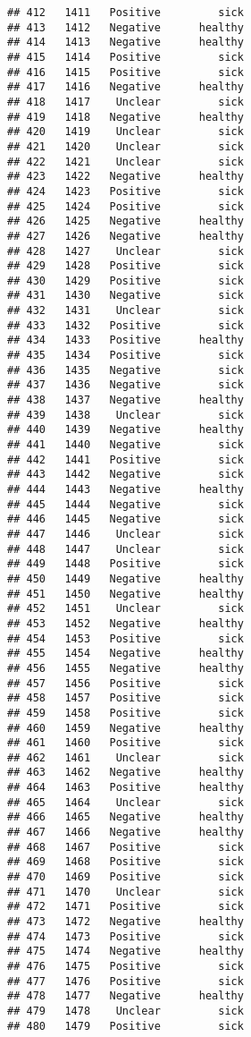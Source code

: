 \documentclass[
]{article}
\begin{document}
\begin{verbatim}
## 412   1411   Positive         sick
## 413   1412   Negative      healthy
## 414   1413   Negative      healthy
## 415   1414   Positive         sick
## 416   1415   Positive         sick
## 417   1416   Negative      healthy
## 418   1417    Unclear         sick
## 419   1418   Negative      healthy
## 420   1419    Unclear         sick
## 421   1420    Unclear         sick
## 422   1421    Unclear         sick
## 423   1422   Negative      healthy
## 424   1423   Positive         sick
## 425   1424   Positive         sick
## 426   1425   Negative      healthy
## 427   1426   Negative      healthy
## 428   1427    Unclear         sick
## 429   1428   Positive         sick
## 430   1429   Positive         sick
## 431   1430   Negative         sick
## 432   1431    Unclear         sick
## 433   1432   Positive         sick
## 434   1433   Positive      healthy
## 435   1434   Positive         sick
## 436   1435   Negative         sick
## 437   1436   Negative         sick
## 438   1437   Negative      healthy
## 439   1438    Unclear         sick
## 440   1439   Negative      healthy
## 441   1440   Negative         sick
## 442   1441   Positive         sick
## 443   1442   Negative         sick
## 444   1443   Negative      healthy
## 445   1444   Negative         sick
## 446   1445   Negative         sick
## 447   1446    Unclear         sick
## 448   1447    Unclear         sick
## 449   1448   Positive         sick
## 450   1449   Negative      healthy
## 451   1450   Negative      healthy
## 452   1451    Unclear         sick
## 453   1452   Negative      healthy
## 454   1453   Positive         sick
## 455   1454   Negative      healthy
## 456   1455   Negative      healthy
## 457   1456   Positive         sick
## 458   1457   Positive         sick
## 459   1458   Positive         sick
## 460   1459   Negative      healthy
## 461   1460   Positive         sick
## 462   1461    Unclear         sick
## 463   1462   Negative      healthy
## 464   1463   Positive      healthy
## 465   1464    Unclear         sick
## 466   1465   Negative      healthy
## 467   1466   Negative      healthy
## 468   1467   Positive         sick
## 469   1468   Positive         sick
## 470   1469   Positive         sick
## 471   1470    Unclear         sick
## 472   1471   Positive         sick
## 473   1472   Negative      healthy
## 474   1473   Positive         sick
## 475   1474   Negative      healthy
## 476   1475   Positive         sick
## 477   1476   Positive         sick
## 478   1477   Negative      healthy
## 479   1478    Unclear         sick
## 480   1479   Positive         sick

\end{verbatim}
\end{document}
